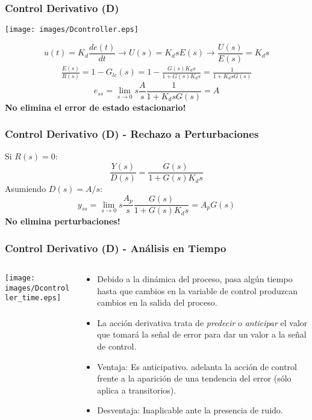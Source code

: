 \documentclass[aspectratio=169,handout]{beamer}
\theoremstyle{definition}
\theoremstyle{plain}
\theoremstyle{remark}
\begin{document}
\begin{frame}[<+->]\frametitle{Control Derivativo (D)}
\begin{center}
  \texttt{[image: images/Dcontroller.eps]}
\end{center}
\pause
\begin{equation*}
  u(t) = K_d \frac{de(t)}{dt} \longrightarrow U(s) = K_d s E(s) \rightarrow \frac{U(s)}{E(s)} = K_d s
\end{equation*}
\pause
\begin{align*}
  \frac{E(s)}{R(s)} = 1 - G_{lc}(s) = 1 - \frac{G(s) K_d s}{1 + G(s) K_d s} = \frac{1}{1 + K_d s G(s)}
\end{align*}
\pause
\begin{equation*}
  e_{ss} = \lim_{s \rightarrow 0} s \frac{A}{s} \frac{1}{1 + K_d s G(s)} = A
\end{equation*}
\pause
\textbf{No elimina el error de estado estacionario!}
\end{frame}

\begin{frame}[<+->]\frametitle{Control Derivativo (D) - Rechazo a Perturbaciones}
Si $R(s) = 0$:
\begin{equation*}
  \frac{Y(s)}{D(s)} = \frac{G(s)}{1 + G(s) K_d s}
\end{equation*}
\pause
Asumiendo $D(s) = A/s$:
\begin{equation*}
  y_{ss} = \lim_{s \rightarrow 0} s \frac{A_p}{s} \frac{G(s)}{1 + G(s) K_d s} = A_p G(s)
\end{equation*}
\pause
\textbf{No elimina perturbaciones!}
\end{frame}

\begin{frame}[<+->]\frametitle{Control Derivativo (D) - Análisis en Tiempo}
\begin{columns}
\begin{column}{0.3\textwidth}
\begin{center}
  \texttt{[image: images/Dcontroller\_time.eps]}
\end{center}
\end{column} 
\begin{column}{0.7\textwidth}
  \begin{itemize}
    \item Debido a la dinámica del proceso, pasa algún tiempo hasta que cambios en la variable de control produzcan cambios en la salida del proceso.
    \item La acción derivativa trata de \textit{predecir} o \textit{anticipar} el valor que tomará la señal de error para dar un valor a la señal de control.
    \item Ventaja: Es anticipativo. adelanta la acción de control frente a la aparición de una tendencia del error (sólo aplica a transitorios).
    \item Desventaja: Inaplicable ante la presencia de ruido.
  \end{itemize}
\end{column} 
\end{columns}
\end{frame}
\end{document}
